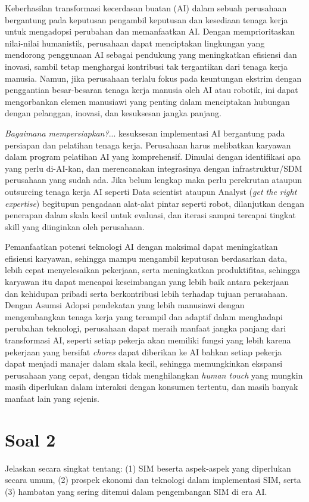 \documentclass{article}
\begin{document}
Keberhasilan transformasi kecerdasan buatan (AI) dalam sebuah perusahaan bergantung pada keputusan pengambil keputusan dan kesediaan tenaga kerja untuk mengadopsi perubahan dan memanfaatkan AI. Dengan memprioritaskan nilai-nilai humanistik, perusahaan dapat menciptakan lingkungan yang mendorong penggunaan AI sebagai pendukung yang meningkatkan efisiensi dan inovasi, sambil tetap menghargai kontribusi tak tergantikan dari tenaga kerja manusia. Namun, jika perusahaan terlalu fokus pada keuntungan ekstrim dengan penggantian besar-besaran tenaga kerja manusia oleh AI atau robotik, ini dapat mengorbankan elemen manusiawi yang penting dalam menciptakan hubungan dengan pelanggan, inovasi, dan kesuksesan jangka panjang.

\emph{Bagaimana mempersiapkan?}... kesuksesan implementasi AI bergantung pada persiapan dan pelatihan tenaga kerja. Perusahaan harus melibatkan karyawan dalam program pelatihan AI yang komprehensif. Dimulai dengan identifikasi apa yang perlu di-AI-kan, dan merencanakan integrasinya dengan infrastruktur/SDM perusahaan yang sudah ada. Jika belum lengkap maka perlu perekrutan ataupun outsurcing tenaga kerja AI seperti Data scientist ataupun Analyst (\emph{get the right expertise}) begitupun pengadaan alat-alat pintar seperti robot, dilanjutkan dengan penerapan dalam skala kecil untuk evaluasi, dan iterasi sampai tercapai tingkat skill yang diinginkan oleh perusahaan.

Pemanfaatkan potensi teknologi AI dengan maksimal dapat meningkatkan efisiensi karyawan, sehingga mampu mengambil keputusan berdasarkan data, lebih cepat menyelesaikan pekerjaan, serta meningkatkan produktifitas, sehingga karyawan itu dapat mencapai keseimbangan yang lebih baik antara pekerjaan dan kehidupan pribadi serta berkontribusi lebih terhadap tujuan perusahaan. Dengan Asumsi Adopsi pendekatan yang lebih manusiawi dengan mengembangkan tenaga kerja yang terampil dan adaptif dalam menghadapi perubahan teknologi, perusahaan dapat meraih manfaat jangka panjang dari transformasi AI, seperti setiap pekerja akan memiliki fungsi yang lebih karena pekerjaan yang bersifat \emph{chores} dapat diberikan ke AI bahkan setiap pekerja dapat menjadi manajer dalam skala kecil, sehingga memungkinkan ekspansi perusahaan yang cepat, dengan tidak menghilangkan \emph{human touch} yang mungkin masih diperlukan dalam interaksi dengan konsumen tertentu, dan masih banyak manfaat lain yang sejenis. 



\section*{Soal 2}
Jelaskan secara singkat tentang: (1) SIM beserta aspek-aspek yang diperlukan secara umum, (2) prospek ekonomi dan teknologi dalam implementasi SIM, serta (3) hambatan yang sering ditemui dalam pengembangan SIM di era AI.
\end{document}

